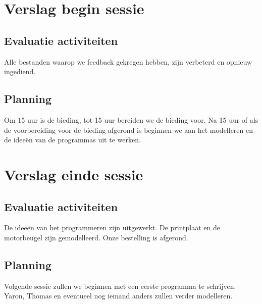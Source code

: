 \documentclass[12pt]{article}
\begin{document}
	\section{Verslag begin sessie}
	
	
	\subsection{Evaluatie activiteiten}
	Alle bestanden waarop we feedback gekregen hebben, zijn verbeterd en opnieuw ingediend. 
	
	\subsection{Planning}
	Om 15 uur is de bieding, tot 15 uur bereiden we de bieding voor. Na 15 uur of als de voorbereiding voor de bieding afgerond is beginnen we aan het modelleren en de ideeën van de programmas uit te werken.
	
	
	\section{Verslag einde sessie}

	\subsection{Evaluatie activiteiten}
	De ideeën van het programmeren zijn uitgewerkt. De printplaat en de motorbeugel zijn gemodelleerd. Onze bestelling is afgerond. 
	
	\subsection{Planning}
	Volgende sessie zullen we beginnen met een eerste programma te schrijven. Yaron, Thomas en eventueel nog iemand anders zullen verder modelleren.
	
	
	
	
	
\end{document}
